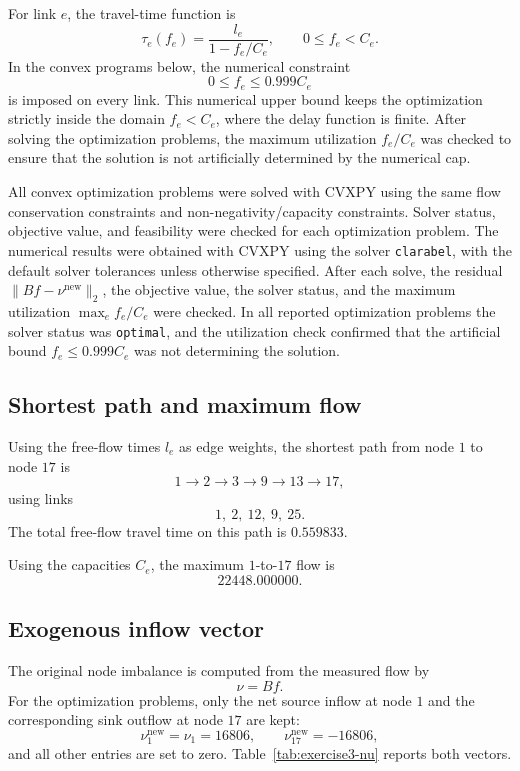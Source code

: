 \documentclass[11pt,a4paper]{article}
\begin{document}
For link \(e\), the travel-time function is
\[
\tau_e(f_e)=\frac{l_e}{1-f_e/C_e}, \qquad 0\leq f_e<C_e.
\]
In the convex programs below, the numerical constraint
\[
0\leq f_e\leq 0.999 C_e
\]
is imposed on every link. This numerical upper bound keeps the optimization strictly inside the domain
$f_e<C_e$, where the delay function is finite. After solving the optimization
problems, the maximum utilization $f_e/C_e$ was checked to ensure that the
solution is not artificially determined by the numerical cap.

All convex optimization problems were solved with CVXPY using the same flow
conservation constraints and non-negativity/capacity constraints. Solver status,
objective value, and feasibility were checked for each optimization problem. The numerical results were obtained with CVXPY using the solver \texttt{clarabel}, with the default solver tolerances unless otherwise specified. After each solve, the residual \(\|Bf-\nu^{\mathrm{new}}\|_2\), the objective value, the solver status, and the maximum utilization \(\max_e f_e/C_e\) were checked. In all reported optimization problems the solver status was \texttt{optimal}, and the utilization check confirmed that the artificial bound \(f_e\leq 0.999C_e\) was not determining the solution.

\subsection*{Shortest path and maximum flow}

Using the free-flow times \(l_e\) as edge weights, the shortest path from node
\(1\) to node \(17\) is
\[
1\to 2\to 3\to 9\to 13\to 17,
\]
using links
\[
1,\ 2,\ 12,\ 9,\ 25.
\]
The total free-flow travel time on this path is \(0.559833\).

Using the capacities \(C_e\), the maximum \(1\)-to-\(17\) flow is
\[
22448.000000.
\]

\subsection*{Exogenous inflow vector}

The original node imbalance is computed from the measured flow by
\[
\nu = Bf.
\]
For the optimization problems, only the net source inflow at node \(1\) and
the corresponding sink outflow at node \(17\) are kept:
\[
\nu^{\mathrm{new}}_1=\nu_1=16806,\qquad
\nu^{\mathrm{new}}_{17}=-16806,
\]
and all other entries are set to zero. Table~\ref{tab:exercise3-nu} reports
both vectors.
\end{document}
